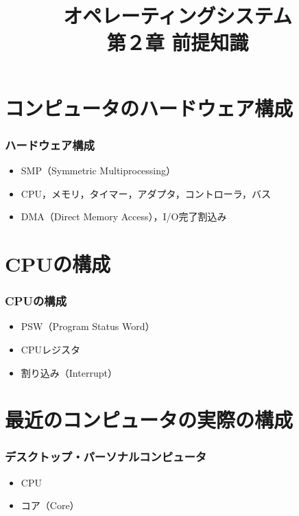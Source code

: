 \documentclass[dvipdfmx]{beamer}
\begin{document}
\title[OS]{オペレーティングシステム\\第２章 前提知識}
\date{}

\begin{frame}
  \titlepage
\end{frame}


\section{コンピュータのハードウェア構成}
\begin{frame}
  \frametitle{ハードウェア構成}
  \begin{itemize}
    \item SMP（Symmetric Multiprocessing）
    \item CPU，メモリ，タイマー，アダプタ，コントローラ，バス
    \item DMA（Direct Memory Access），I/O完了割込み
  \end{itemize}
\end{frame}

\section{CPUの構成}
\begin{frame}
  \frametitle{CPUの構成}
  \begin{itemize}
    \item PSW（Program Status Word）
    \item CPUレジスタ
    \item 割り込み（Interrupt）
  \end{itemize}
\end{frame}

\section{最近のコンピュータの実際の構成}
\begin{frame}
  \frametitle{デスクトップ・パーソナルコンピュータ}
  \begin{itemize}
    \item CPU
    \item コア（Core）
  \end{itemize}
\end{frame}
\end{document}
